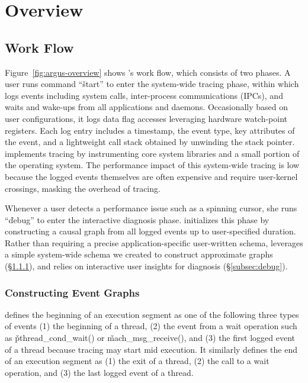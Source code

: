 \section{Overview} \label{sec:overview}

\subsection{\xxx Work Flow}

\begin{figure*}[tb]
    \centering
	
    \caption{\xxx Work Flow}
    \label{fig:argus-overview}
\end{figure*}

Figure~\ref{fig:argus-overview} shows \xxx's work flow, which consists of two
phases.  A user runs command ``\v{\xxx start}'' to enter the system-wide
tracing phase, within which \xxx logs events including system calls,
inter-process communications (IPCs), and waits and wake-ups from all
applications and daemons.  Occasionally based on user configurations, it logs
data flag accesses leveraging hardware watch-point registers.  Each log entry
includes a timestamp, the event type, key attributes of the event, and a
lightweight call stack obtained by unwinding the stack pointer.  \xxx
implements tracing by instrumenting core system libraries and a small portion
of the operating system.  The performance impact of this system-wide tracing is
low because the logged events themselves are often expensive and require
user-kernel crossings, masking the overhead of tracing.

Whenever a user detects a performance issue such as a spinning cursor, she runs
``\v{\xxx debug}'' to enter the interactive diagnosis phase.  \xxx initializes
this phase by constructing a causal graph from all logged events up to
user-specified duration.  Rather than requiring a precise application-specific
user-written schema, \xxx leverages a simple system-wide schema we created to
construct approximate graphs (\S\ref{subsec:graph}), and relies on interactive
user insights for diagnosis (\S\ref{subsec:debug}).

\subsubsection{Constructing Event Graphs} \label{subsec:graph}

\xxx defines the beginning of an execution segment as one of the following
three types of events (1) the beginning of a thread, (2) the event from a wait
operation such as \v{pthread\_cond\_wait()} or \v{mach\_msg\_receive()}, and
(3) the first logged event of a thread because tracing may start mid execution.
It similarly defines the end of an execution segment as (1) the exit of a
thread, (2) the call to a wait operation, and (3) the last logged event of a
thread.

